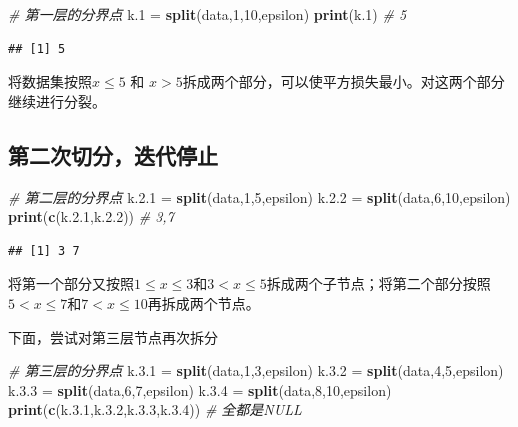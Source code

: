 \documentclass[
]{ctexart}
\newenvironment{Shaded}{\begin{snugshade}}{\end{snugshade}}
\newcommand{\CommentTok}[1]{\textcolor[rgb]{0.56,0.35,0.01}{\textit{#1}}}
\newcommand{\DecValTok}[1]{\textcolor[rgb]{0.00,0.00,0.81}{#1}}
\newcommand{\FloatTok}[1]{\textcolor[rgb]{0.00,0.00,0.81}{#1}}
\newcommand{\FunctionTok}[1]{\textcolor[rgb]{0.13,0.29,0.53}{\textbf{#1}}}
\newcommand{\NormalTok}[1]{#1}
\newcommand{\OtherTok}[1]{\textcolor[rgb]{0.56,0.35,0.01}{#1}}
\begin{document}
\begin{Shaded}
\begin{Highlighting}[]
\CommentTok{\# 第一层的分界点}
\NormalTok{k}\FloatTok{.1} \OtherTok{=} \FunctionTok{split}\NormalTok{(data,}\DecValTok{1}\NormalTok{,}\DecValTok{10}\NormalTok{,epsilon)}
\FunctionTok{print}\NormalTok{(k}\FloatTok{.1}\NormalTok{) }\CommentTok{\# 5}
\end{Highlighting}
\end{Shaded}

\begin{verbatim}
## [1] 5
\end{verbatim}

将数据集按照\(x\le5\) 和
\(x>5\)拆成两个部分，可以使平方损失最小。对这两个部分继续进行分裂。

\hypertarget{ux7b2cux4e8cux6b21ux5207ux5206ux8fedux4ee3ux505cux6b62}{%
\subsection{第二次切分，迭代停止}\label{ux7b2cux4e8cux6b21ux5207ux5206ux8fedux4ee3ux505cux6b62}}

\begin{Shaded}
\begin{Highlighting}[]
\CommentTok{\# 第二层的分界点}
\NormalTok{k.}\FloatTok{2.1} \OtherTok{=} \FunctionTok{split}\NormalTok{(data,}\DecValTok{1}\NormalTok{,}\DecValTok{5}\NormalTok{,epsilon)}
\NormalTok{k.}\FloatTok{2.2} \OtherTok{=} \FunctionTok{split}\NormalTok{(data,}\DecValTok{6}\NormalTok{,}\DecValTok{10}\NormalTok{,epsilon)}
\FunctionTok{print}\NormalTok{(}\FunctionTok{c}\NormalTok{(k.}\FloatTok{2.1}\NormalTok{,k.}\FloatTok{2.2}\NormalTok{)) }\CommentTok{\# 3,7}
\end{Highlighting}
\end{Shaded}

\begin{verbatim}
## [1] 3 7
\end{verbatim}

将第一个部分又按照\(1\le x \le 3\)和\(3<x\le 5\)拆成两个子节点；将第二个部分按照\(5< x \le 7\)和\(7<x \le 10\)再拆成两个节点。

下面，尝试对第三层节点再次拆分

\begin{Shaded}
\begin{Highlighting}[]
\CommentTok{\# 第三层的分界点}
\NormalTok{k.}\FloatTok{3.1} \OtherTok{=} \FunctionTok{split}\NormalTok{(data,}\DecValTok{1}\NormalTok{,}\DecValTok{3}\NormalTok{,epsilon)}
\NormalTok{k.}\FloatTok{3.2} \OtherTok{=} \FunctionTok{split}\NormalTok{(data,}\DecValTok{4}\NormalTok{,}\DecValTok{5}\NormalTok{,epsilon)}
\NormalTok{k.}\FloatTok{3.3} \OtherTok{=} \FunctionTok{split}\NormalTok{(data,}\DecValTok{6}\NormalTok{,}\DecValTok{7}\NormalTok{,epsilon)}
\NormalTok{k.}\FloatTok{3.4} \OtherTok{=} \FunctionTok{split}\NormalTok{(data,}\DecValTok{8}\NormalTok{,}\DecValTok{10}\NormalTok{,epsilon)}
\FunctionTok{print}\NormalTok{(}\FunctionTok{c}\NormalTok{(k.}\FloatTok{3.1}\NormalTok{,k.}\FloatTok{3.2}\NormalTok{,k.}\FloatTok{3.3}\NormalTok{,k.}\FloatTok{3.4}\NormalTok{)) }\CommentTok{\# 全都是NULL}
\end{Highlighting}
\end{Shaded}
\end{document}
